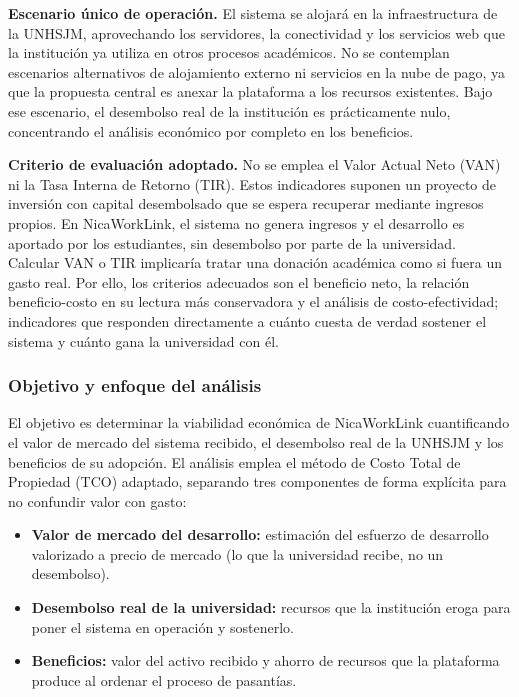 \textbf{Escenario único de operación.} El sistema se alojará en la infraestructura de la UNHSJM, aprovechando los servidores, la conectividad y los servicios web que la institución ya utiliza en otros procesos académicos. No se contemplan escenarios alternativos de alojamiento externo ni servicios en la nube de pago, ya que la propuesta central es anexar la plataforma a los recursos existentes. Bajo ese escenario, el desembolso real de la institución es prácticamente nulo, concentrando el análisis económico por completo en los beneficios.

\textbf{Criterio de evaluación adoptado.} No se emplea el Valor Actual Neto (VAN) ni la Tasa Interna de Retorno (TIR). Estos indicadores suponen un proyecto de inversión con capital desembolsado que se espera recuperar mediante ingresos propios. En NicaWorkLink, el sistema no genera ingresos y el desarrollo es aportado por los estudiantes, sin desembolso por parte de la universidad. Calcular VAN o TIR implicaría tratar una donación académica como si fuera un gasto real. Por ello, los criterios adecuados son el beneficio neto, la relación beneficio-costo en su lectura más conservadora y el análisis de costo-efectividad; indicadores que responden directamente a cuánto cuesta de verdad sostener el sistema y cuánto gana la universidad con él.

\subsubsection{Objetivo y enfoque del análisis}

El objetivo es determinar la viabilidad económica de NicaWorkLink cuantificando el valor de mercado del sistema recibido, el desembolso real de la UNHSJM y los beneficios de su adopción. El análisis emplea el método de Costo Total de Propiedad (TCO) adaptado, separando tres componentes de forma explícita para no confundir valor con gasto:

\begin{itemize}
	\item \textbf{Valor de mercado del desarrollo:} estimación del esfuerzo de desarrollo valorizado a precio de mercado (lo que la universidad recibe, no un desembolso).
	\item \textbf{Desembolso real de la universidad:} recursos que la institución eroga para poner el sistema en operación y sostenerlo.
	\item \textbf{Beneficios:} valor del activo recibido y ahorro de recursos que la plataforma produce al ordenar el proceso de pasantías.
\end{itemize}

